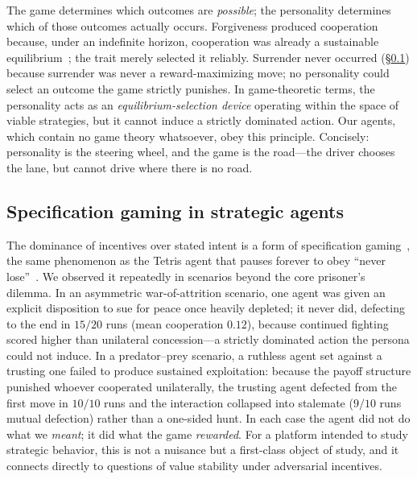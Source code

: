 The game determines which outcomes are \emph{possible}; the personality determines which of those outcomes actually occurs. Forgiveness produced cooperation because, under an indefinite horizon, cooperation was already a sustainable equilibrium~\cite{fudenberg1986folk}; the trait merely selected it reliably. Surrender never occurred (\S\ref{sec:discussion-spec}) because surrender was never a reward-maximizing move; no personality could select an outcome the game strictly punishes. In game-theoretic terms, the personality acts as an \emph{equilibrium-selection device} operating within the space of viable strategies, but it cannot induce a strictly dominated action. Our agents, which contain no game theory whatsoever, obey this principle. Concisely: personality is the steering wheel, and the game is the road---the driver chooses the lane, but cannot drive where there is no road.

\subsection{Specification gaming in strategic agents}
\label{sec:discussion-spec}
The dominance of incentives over stated intent is a form of specification gaming~\cite{amodei2016concrete, krakovna2020specification}, the same phenomenon as the Tetris agent that pauses forever to obey ``never lose''~\cite{murphy2013mario}. We observed it repeatedly in scenarios beyond the core prisoner's dilemma. In an asymmetric war-of-attrition scenario, one agent was given an explicit disposition to sue for peace once heavily depleted; it never did, defecting to the end in $15/20$ runs (mean cooperation $0.12$), because continued fighting scored higher than unilateral concession---a strictly dominated action the persona could not induce. In a predator--prey scenario, a ruthless agent set against a trusting one failed to produce sustained exploitation: because the payoff structure punished whoever cooperated unilaterally, the trusting agent defected from the first move in $10/10$ runs and the interaction collapsed into stalemate ($9/10$ runs mutual defection) rather than a one-sided hunt. In each case the agent did not do what we \emph{meant}; it did what the game \emph{rewarded}. For a platform intended to study strategic behavior, this is not a nuisance but a first-class object of study, and it connects directly to questions of value stability under adversarial incentives.

